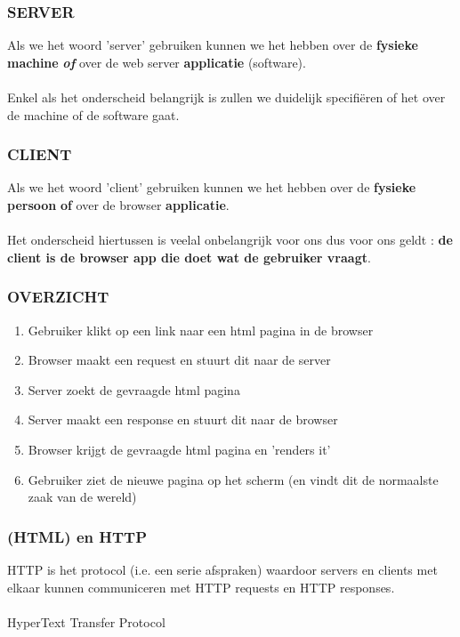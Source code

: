 \documentclass{beamer}
\begin{document}
\begin{frame}

\frametitle{SERVER}

{\LARGE Als we het woord 'server' gebruiken kunnen we het hebben over de \textbf{fysieke machine} {\huge \textbf{\textit{of}}} over de web server \textbf{applicatie} (software).\\~\\
Enkel als het onderscheid belangrijk is zullen we duidelijk specifi\"eren of het over de machine of de software gaat.}

\end{frame}


\begin{frame}

\frametitle{CLIENT}

{\LARGE Als we het woord 'client' gebruiken kunnen we het hebben over de \textbf{fysieke persoon} {\huge \textbf{of}} over de browser \textbf{applicatie}.\\~\\
Het onderscheid hiertussen is veelal onbelangrijk voor ons dus voor ons geldt : \textbf{de client is de browser app die doet wat de gebruiker vraagt}.}

\end{frame}


\begin{frame}

\frametitle{OVERZICHT}

{\Large \begin{enumerate}
  \item Gebruiker klikt op een link naar een html pagina in de browser
  \item Browser maakt een request en stuurt dit naar de server
  \item Server zoekt de gevraagde html pagina
  \item Server maakt een response en stuurt dit naar de browser
  \item Browser krijgt de gevraagde html pagina en 'renders it'
  \item Gebruiker ziet de nieuwe pagina op het scherm (en vindt dit de normaalste zaak van de wereld)
\end{enumerate}}

\end{frame}


\begin{frame}

\frametitle{(HTML) en HTTP}

{\Large HTTP is het protocol (i.e. een serie afspraken) waardoor servers en clients met elkaar kunnen communiceren met HTTP requests
en HTTP responses.}\\~\\

{\huge HyperText Transfer Protocol}\\~\\

\end{frame}
\end{document}
